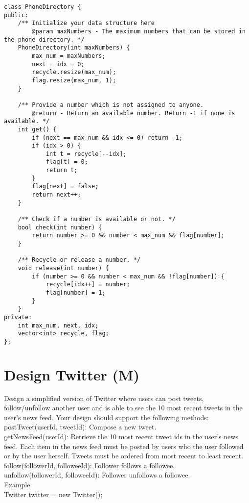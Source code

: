 \begin{lstlisting}
class PhoneDirectory {
public:
    /** Initialize your data structure here
        @param maxNumbers - The maximum numbers that can be stored in the phone directory. */
    PhoneDirectory(int maxNumbers) {
        max_num = maxNumbers;
        next = idx = 0;
        recycle.resize(max_num);
        flag.resize(max_num, 1);
    }
    
    /** Provide a number which is not assigned to anyone.
        @return - Return an available number. Return -1 if none is available. */
    int get() {
        if (next == max_num && idx <= 0) return -1;
        if (idx > 0) {
            int t = recycle[--idx];
            flag[t] = 0;
            return t;
        }
        flag[next] = false;
        return next++;
    }
    
    /** Check if a number is available or not. */
    bool check(int number) {
        return number >= 0 && number < max_num && flag[number];
    }
    
    /** Recycle or release a number. */
    void release(int number) {
        if (number >= 0 && number < max_num && !flag[number]) {
            recycle[idx++] = number;
            flag[number] = 1;
        }
    }
private:
    int max_num, next, idx;
    vector<int> recycle, flag;
};
\end{lstlisting}


\section{Design Twitter (M)}
Design a simplified version of Twitter where users can post tweets, follow/unfollow another user and is able to see the 10 most recent tweets in the user's news feed. Your design should support the following methods:\\
    postTweet(userId, tweetId): Compose a new tweet.\\
    getNewsFeed(userId): Retrieve the 10 most recent tweet ids in the user's news feed. Each item in the news feed must be posted by users who the user followed or by the user herself. Tweets must be ordered from most recent to least recent.\\
    follow(followerId, followeeId): Follower follows a followee.\\
    unfollow(followerId, followeeId): Follower unfollows a followee.\\

Example:\\
Twitter twitter = new Twitter();\\

